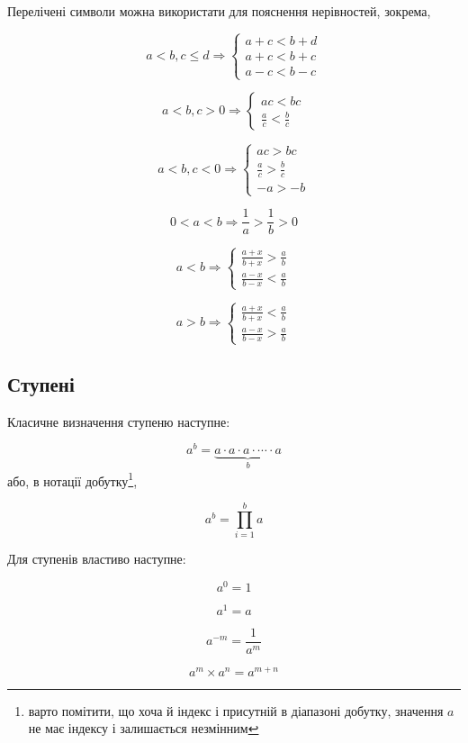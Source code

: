 \documentclass[
  11pt,
]{book}
\begin{document}
Перелічені символи можна використати для пояснення нерівностей, зокрема,

\[a < b, c \leq d \Rightarrow \begin{cases}
a + c < b + d\\
a + c < b + c\\
a - c < b - c
\end{cases}\]

\[a < b, c > 0 \Rightarrow \begin{cases}
ac < bc\\
\frac{a}{c} < \frac{b}{c}
\end{cases}\]

\[a < b, c < 0 \Rightarrow \begin{cases}
ac > bc\\
\frac{a}{c} > \frac{b}{c}\\
-a > -b
\end{cases}\]

\[0 < a < b\Rightarrow \frac{1}{a} > \frac{1}{b} > 0\]

\[a < b\Rightarrow \begin{cases}
\frac{a+x}{b+x} > \frac{a}{b} \\
\frac{a-x}{b-x} < \frac{a}{b}
\end{cases}\]

\[a > b\Rightarrow \begin{cases}
\frac{a+x}{b+x} < \frac{a}{b} \\
\frac{a-x}{b-x} > \frac{a}{b}
\end{cases}\]

\subsection{Ступені}\label{ux441ux442ux443ux43fux435ux43dux456}

Класичне визначення ступеню наступне:

\[a^b = \underbrace{a \cdot a \cdot a \cdot \cdots \cdot a}_b\] або, в
нотації добутку\footnote{варто помітити, що хоча й індекс \(і\)
  присутній в діапазоні добутку, значення \(a\) не має індексу і
  залишається незмінним},

\[a^b = \prod\limits_{i=1}^b a\]

Для ступенів властиво наступне:

\[a^0 = 1\]

\[a^1 = a\]

\[a^{-m} = \frac{1}{a^m}\]

\[a^m \times a^n = a^{m+n}\]
\end{document}
